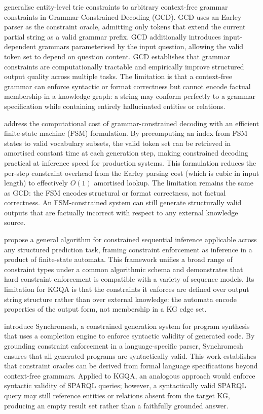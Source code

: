 \citet{geng2023grammarconstrained} generalise entity-level trie constraints to arbitrary context-free grammar constraints in Grammar-Constrained Decoding (GCD). GCD uses an Earley parser as the constraint oracle, admitting only tokens that extend the current partial string as a valid grammar prefix. GCD additionally introduces input-dependent grammars parameterised by the input question, allowing the valid token set to depend on question content. GCD establishes that grammar constraints are computationally tractable and empirically improve structured output quality across multiple tasks. The limitation is that a context-free grammar can enforce syntactic or format correctness but cannot encode factual membership in a knowledge graph: a string may conform perfectly to a grammar specification while containing entirely hallucinated entities or relations.

\citet{willard2023outlines} address the computational cost of grammar-constrained decoding with an efficient finite-state machine (FSM) formulation. By precomputing an index from FSM states to valid vocabulary subsets, the valid token set can be retrieved in amortised constant time at each generation step, making constrained decoding practical at inference speed for production systems. This formulation reduces the per-step constraint overhead from the Earley parsing cost (which is cubic in input length) to effectively $O(1)$ amortised lookup. The limitation remains the same as GCD: the FSM encodes structural or format correctness, not factual correctness. An FSM-constrained system can still generate structurally valid outputs that are factually incorrect with respect to any external knowledge source.

\citet{deutsch2019constrained} propose a general algorithm for constrained sequential inference applicable across any structured prediction task, framing constraint enforcement as inference in a product of finite-state automata. This framework unifies a broad range of constraint types under a common algorithmic schema and demonstrates that hard constraint enforcement is compatible with a variety of sequence models. Its limitation for KGQA is that the constraints it enforces are defined over output string structure rather than over external knowledge: the automata encode properties of the output form, not membership in a KG edge set.

\citet{poesia2022synchromesh} introduce Synchromesh, a constrained generation system for program synthesis that uses a completion engine to enforce syntactic validity of generated code. By grounding constraint enforcement in a language-specific parser, Synchromesh ensures that all generated programs are syntactically valid. This work establishes that constraint oracles can be derived from formal language specifications beyond context-free grammars. Applied to KGQA, an analogous approach would enforce syntactic validity of SPARQL queries; however, a syntactically valid SPARQL query may still reference entities or relations absent from the target KG, producing an empty result set rather than a faithfully grounded answer.

